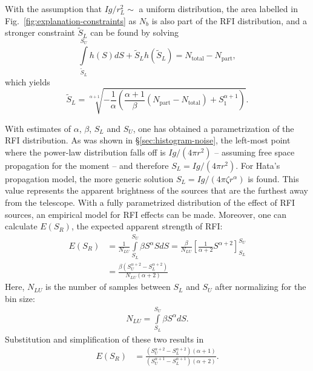 \documentclass[useAMS,usenatbib]{mn2e}
\begin{document}
With the assumption that $Ig/r_L^2\sim$ a uniform distribution, the area labelled in Fig.~\ref{fig:explanation-constraints} as $N_b$ is also part of the RFI distribution, and a stronger constraint $\tilde S_L$ can be found by solving
\begin{equation}
 \int\limits_{\tilde S_L}^{S_U} h(S) dS + \tilde S_{L} h(\tilde S_{L}) = N_\textrm{total} - N_\textrm{part},
\end{equation}
which yields
\begin{equation} \label{eq:lower-limit-2}
\tilde S_L = \sqrt[\alpha+1]{ - \frac{1}{\alpha} \left( \frac{\alpha+1}{\beta} \left(N_\textrm{part} - N_\textrm{total}\right) + S_1^{\alpha+1} \right) }.
\end{equation}

With estimates of $\alpha$, $\beta$, $S_L$ and $S_U$, one has obtained a parametrization of the RFI distribution. As was shown in \S\ref{sec:histogram-noise}, the left-most point where the power-law distribution falls off is $Ig/(4\pi r^2)$ -- assuming free space propagation for the moment -- and therefore $S_L = Ig/(4\pi r^2)$. For Hata's propagation model, the more generic solution $S_L = Ig / (4\pi \zeta r^\alpha)$ is found. This value represents the apparent brightness of the sources that are the furthest away from the telescope. With a fully parametrized distribution of the effect of RFI sources, an empirical model for RFI effects can be made. Moreover, one can calculate $E(S_R)$, the expected apparent strength of RFI:
\begin{align} \label{eq:expected-value-rfi-def}
E(S_R) & = \frac{1}{N_{LU}}\int\limits_{S_L}^{S_U} \beta S^\alpha S dS
 = \frac{\beta}{N_{LU}} \left[ \frac{1}{\alpha+2} S^{\alpha+2} \right]_{S_L}^{S_U} \\
 & = \frac{\beta \left( S_U^{\alpha+2} - S_L^{\alpha+2} \right) }{N_{LU} \left( \alpha+2\right) }
\end{align}
Here, $N_{LU}$ is the number of samples between $S_L$ and $S_U$ after normalizing for the bin size:
\begin{align} \label{eq:n-between-sl-su}
N_{LU} = \int\limits_{S_L}^{S_U} \beta S^\alpha dS.
\end{align}
Substitution and simplification of these two results in
\begin{align} \label{eq:expected-value-rfi}
 E(S_R) & = \frac
{\left( S_U^{\alpha+2} - S_L^{\alpha+2}\right)\left(\alpha+1\right)} 
{\left(S_U^{\alpha+1} - S_L^{\alpha+1}\right) \left(\alpha+2 \right)}.
\end{align}
\end{document}
